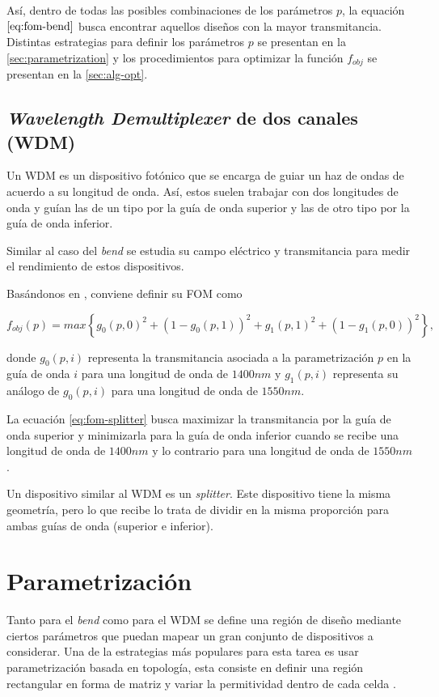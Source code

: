 Así, dentro de todas las posibles combinaciones de los parámetros $p$, la
equación $\ref{eq:fom-bend}$ busca encontrar aquellos diseños con la mayor transmitancia.
Distintas estrategias para definir los parámetros $p$ se presentan en la
\autoref{sec:parametrization} y 
los procedimientos para optimizar la función $f_{obj}$ se presentan en la
\autoref{sec:alg-opt}.

\subsection{\emph{Wavelength Demultiplexer} de dos canales (WDM)}

Un WDM es un dispositivo fotónico que se encarga de guiar un haz de ondas de acuerdo a su longitud de onda.
Así, estos suelen trabajar con dos longitudes de onda y guían las de un tipo por la guía de onda superior y las de otro tipo por la guía de onda inferior.

Similar al caso del \emph{bend} se estudia su campo eléctrico y transmitancia para medir el rendimiento de estos dispositivos.

Basándonos en \cite{Su2020}, conviene definir su FOM como

\begin{equation}
  f_{obj}(p) = max \left \{ g_0(p, 0)^2 + (1 - g_0(p, 1))^2 + g_1(p, 1)^2 + (1
  - g_1(p, 0))^2 \right \},
\label{eq:fom-splitter}
\end{equation}

donde $g_0(p, i)$ representa la transmitancia asociada a la parametrización $p$ en la guía de onda $i$ para una longitud de onda de $1400 nm$ y 
      $g_1(p, i)$ representa su análogo de $g_0(p, i)$ para una longitud de onda de $1550 nm$.

La ecuación \ref{eq:fom-splitter} busca maximizar la transmitancia por la guía de onda superior y minimizarla para la guía de onda inferior cuando se recibe una longitud de onda de $1400 nm$ y lo contrario para una longitud de onda de $1550 nm$.

Un dispositivo similar al WDM es un \emph{splitter}. Este dispositivo tiene la
misma geometría, pero lo que recibe lo trata de dividir en la misma proporción
para ambas guías de onda (superior e inferior).

\section{Parametrización}\label{sec:parametrization}

Tanto para el \emph{bend} como para el WDM se define una región de diseño
mediante ciertos parámetros que puedan mapear un gran conjunto de dispositivos a considerar.
Una de la estrategias más populares para esta tarea es usar parametrización
basada en topología, esta consiste en definir una región rectangular en forma
de matriz y variar la permitividad dentro de cada celda \citep{Molesky2018}.

